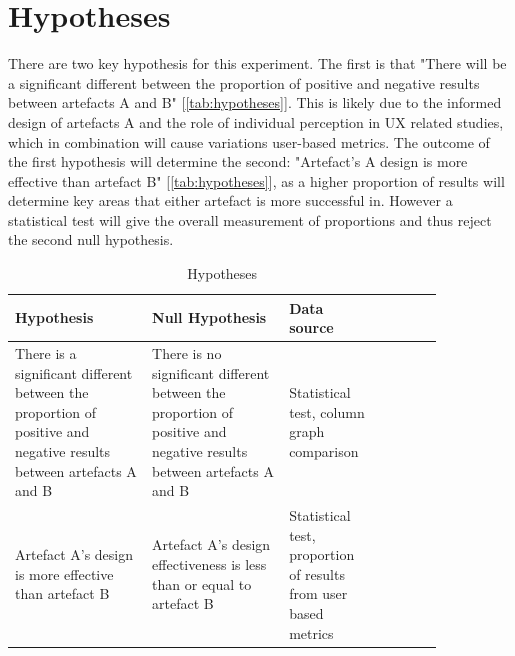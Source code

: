 \documentclass[article]{IEEEtran}
\begin{document}
        \section{Hypotheses}
            There are two key hypothesis for this experiment. The first is that "There will be a significant different between the proportion of positive and negative results between artefacts A and B" [\autoref{tab:hypotheses}]. This is likely due to the informed design of artefacts A and the role of individual perception in UX related studies, which in combination will cause variations user-based metrics. The outcome of the first hypothesis will determine the second: "Artefact's A design is more effective than artefact B" [\autoref{tab:hypotheses}], as a higher proportion of results will determine key areas that either artefact is more successful in. However a statistical test will give the overall measurement of proportions and thus reject the second null hypothesis.

            \begin{table}[ht]
                \caption{Hypotheses}
                \centering
                \renewcommand{\arraystretch}{1.5}
                
                \begin{tabular}{p{0.32\linewidth} | p{0.32\linewidth} | p{0.21\linewidth}|c|c|c|}
                    \hline
                    \textbf{Hypothesis} & \textbf{Null Hypothesis} & \textbf{Data source} \\ \hline
                    There is a significant different between the proportion of positive and negative results between artefacts A and B & 
                    There is no significant different between the proportion of positive and negative results between artefacts A and B & 
                    Statistical test, column graph comparison \\ \hline
                    
                    Artefact A's design is more effective than artefact B & 
                    Artefact A's design effectiveness is less than or equal to artefact B & 
                    Statistical test, proportion of results from user based metrics \\ \hline
                \end{tabular}
                \label{tab:hypotheses}
            \end{table}
\end{document}
